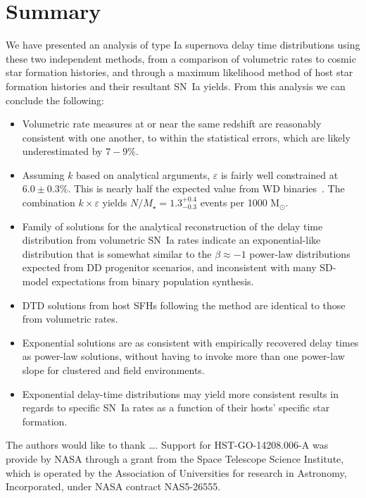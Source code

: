 \documentclass[apj]{aastex62}
\begin{document}
\section{Summary}
We have presented an analysis of type Ia supernova delay time distributions using these two independent methods, from a comparison of volumetric  rates to cosmic star formation histories, and through a maximum likelihood method of host star formation histories and their resultant SN~Ia yields. From this analysis we can conclude the following:
\begin{itemize}
	\item Volumetric rate measures at or near the same redshift are reasonably consistent with one another, to within the statistical errors, which are likely underestimated by $7-9\%$.
	\item  Assuming $k$ based on analytical arguments, $\varepsilon$ is fairly well constrained at $6.0\pm0.3\%$. This is nearly half the expected value from WD binaries~\citep{Maoz:2017zl}. The combination $k\times\varepsilon$ yields $N/M_\star=1.3^{+0.4}_{-0.3}$ events per 1000 M$_{\odot}$.
	\item Family of solutions for the analytical reconstruction of the delay time distribution from volumetric SN~Ia rates indicate an exponential-like distribution that is somewhat similar to the $\beta\approx-1$ power-law distributions expected from DD progenitor scenarios, and inconsistent with many SD-model expectations from binary population synthesis. 
	\item DTD solutions from host SFHs following the \cite{Maoz:2011} method are identical to those from volumetric rates. 
	\item Exponential solutions are as consistent with empirically recovered delay times as power-law solutions, without having to invoke more than one power-law slope for clustered and field environments.
	\item Exponential delay-time distributions may yield more consistent results in regards to specific SN~Ia rates as a function of their hosts' specific star formation.
\end{itemize}

\acknowledgments The authors would like to thank \ldots. Support for HST-GO-14208.006-A was provide by NASA through a grant from the Space Telescope Science Institute, which is operated by the Association of Universities for research in Astronomy, Incorporated, under NASA contract NAS5-26555.

{}
\end{document}
